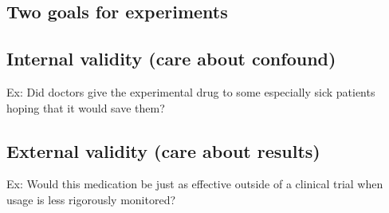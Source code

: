 \subsection*{Two goals for experiments}
\subsection*{Internal validity (care about confound)}
\begin{flushleft}
Ex: Did doctors give the experimental drug to some especially sick patients hoping that it would save them?
\end{flushleft}

\subsection*{External validity (care about results)}
\begin{flushleft}
Ex: Would this medication be just as effective outside of a clinical trial when usage is less rigorously monitored?
\end{flushleft}